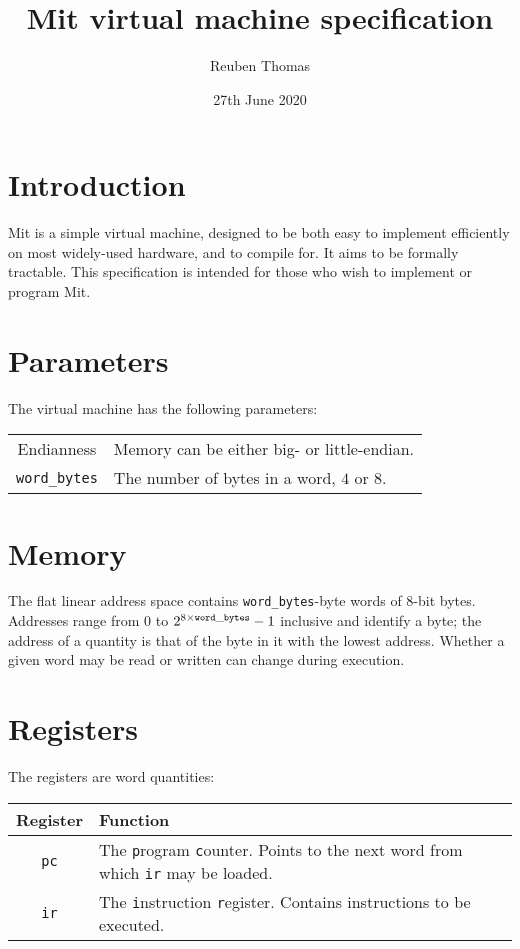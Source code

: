 \documentclass[a4paper]{article}
\title{Mit virtual machine specification}
\author{Reuben Thomas}
\date{27th June 2020}
\begin{document}
\maketitle

\section{Introduction}

Mit is a simple virtual machine, designed to be both easy to implement efficiently on most widely-used hardware, and to compile for. It aims to be formally tractable. This specification is intended for those who wish to implement or program Mit.


\section{Parameters}

The virtual machine has the following parameters:

\begin{center}
\begin{tabular}{cp{3.25in}} \toprule
Endianness & Memory can be either big- or little-endian. \\
{\tt word\_bytes} & The number of bytes in a word, $4$ or $8$. \\
 \bottomrule
\end{tabular}
\end{center}


\section{Memory}

The flat linear address space contains {\tt word\_bytes}-byte words of $8$-bit bytes. Addresses range from $0$ to $2^{8\times{\tt word\_bytes}}-1$ inclusive and identify a byte; the address of a quantity is that of the byte in it with the lowest address. Whether a given word may be read or written can change during execution.


\section{Registers}
\label{registers}

The registers are word quantities:

\begin{center}
\begin{tabular}{cp{3.75in}} \toprule
\bf Register & \bf Function \\
 \midrule
{\tt pc} & The {\tt p}rogram {\tt c}ounter. Points to the next word from which {\tt ir} may be loaded. \\
{\tt ir} & The {\tt i}nstruction {\tt r}egister. Contains instructions to be executed. \\
 \bottomrule
\end{tabular}
\end{center}
\end{document}
